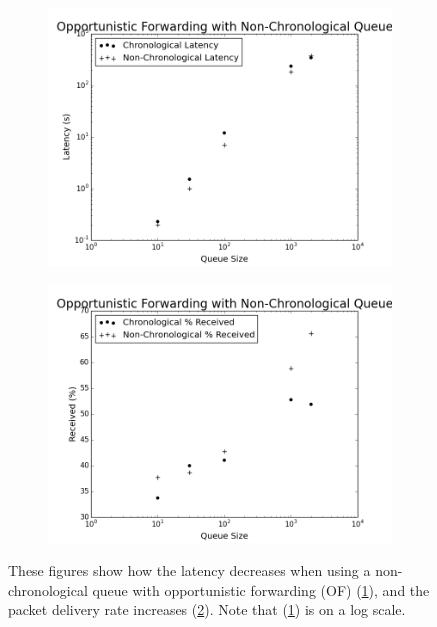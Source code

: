         \begin{figure}
            \centering
            \begin{subfigure}{0.5\textwidth}
                \centering
                \includegraphics[width=\linewidth]{./images/OF_Non_Chron_Latency.png}
                \caption{}
                \label{fig:of_non_chron_latency}
            \end{subfigure}%
            \begin{subfigure}{0.5\textwidth}
                \includegraphics[width=\linewidth]{./images/OF_Non_Chron_Received.png}
                \caption{}
                \label{fig:of_non_chron_received}
            \end{subfigure}
            \caption{These figures show how the latency decreases when using a non-chronological queue with opportunistic forwarding (OF) (\ref{fig:of_non_chron_latency}), and the packet delivery rate increases (\ref{fig:of_non_chron_received}). Note that (\ref{fig:of_non_chron_latency}) is on a log scale.}
            \label{fig:priority_queue}
        \end{figure}


